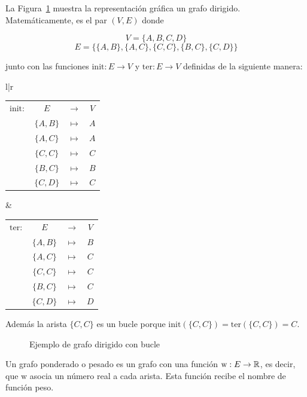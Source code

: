 \begin{ejemplo}
	La Figura~\ref{fig:grafo_dirigido} muestra la representación gráfica un grafo dirigido. Matemáticamente, es el par $(V,E)$ donde
	
	\[V  = \{A, B, C, D\}\]
	\[E = \{ \{A,B\}, \{A,C\}, \{C,C\},\{B,C\}, \{C,D\} \} \]
	
	junto con las funciones $\mathrm{init} : E \to V $ y $\mathrm{ter} : E \to V$ definidas de la siguiente manera:
	
	\begin{center}
		\begin{tabular}{l|r}
			\begin{tabular}{r c c c}
				$\mathrm{init}:$ & $E$ & $\to$ & $V$\\
				& $\{A,B\}$ & $\mapsto$ & $A$\\
				& $\{A,C\}$ & $\mapsto$ & $A$\\
				& $\{C,C\}$ & $\mapsto$ & $C$\\
				& $\{B,C\}$ & $\mapsto$ & $B$\\
				& $\{C,D\}$ & $\mapsto$ & $C$\\
				
			\end{tabular} &
			\begin{tabular}{r c c c}
				$\mathrm{ter}:$ & $E$ & $\to$ & $V$\\
				& $\{A,B\}$ & $\mapsto$ & $B$\\
				& $\{A,C\}$ & $\mapsto$ & $C$\\
				& $\{C,C\}$ & $\mapsto$ & $C$\\
				& $\{B,C\}$ & $\mapsto$ & $C$\\
				& $\{C,D\}$ & $\mapsto$ & $D$\\
				
			\end{tabular} 
		\end{tabular}
	\end{center}
	
	Además la arista $\{C,C\}$ es un bucle porque $\mathrm{init}(\{C,C\}) = \mathrm{ter}(\{C,C\}) = C$.
	
	\begin{figure}[h]
		\centering
		\ejemplografodirigido
		\caption{Ejemplo de grafo dirigido con bucle}
		\label{fig:grafo_dirigido}
	\end{figure}
	
\end{ejemplo}

\begin{defi}
	Un grafo ponderado o pesado es un grafo con una función $\mathrm{w} : E \to \mathbb{R}$, es decir, que $\mathrm{w}$ asocia un número real a cada arista. Esta función recibe el nombre de función peso.
\end{defi}

